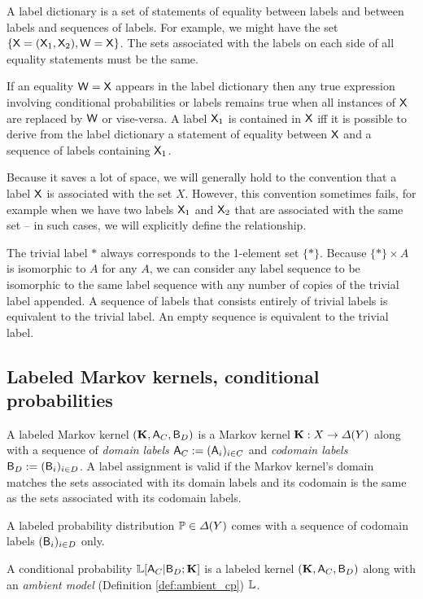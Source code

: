 A label dictionary is a set of statements of equality between labels and between labels and sequences of labels. For example, we might have the set $\{\mathsf{X}=(\mathsf{X}_1,\mathsf{X}_2),\mathsf{W}=\mathsf{X}\}$. The sets associated with the labels on each side of all equality statements must be the same.

If an equality $\mathsf{W}=\mathsf{X}$ appears in the label dictionary then any true expression involving conditional probabilities or labels remains true when all instances of $\mathsf{X}$ are replaced by $\mathsf{W}$ or vise-versa. A label $\mathsf{X}_1$ is contained in $\mathsf{X}$ iff it is possible to derive from the label dictionary a statement of equality between $\mathsf{X}$ and a sequence of labels containing $\mathsf{X}_1$.

Because it saves a lot of space, we will generally hold to the convention that a label $\mathsf{X}$ is associated with the set $X$. However, this convention sometimes fails, for example when we have two labels $\mathsf{X}_1$ and $\mathsf{X}_2$ that are associated with the same set -- in such cases, we will explicitly define the relationship.

The trivial label $*$ always corresponds to the 1-element set $\{*\}$. Because $\{*\}\times A$ is isomorphic to $A$ for any $A$, we can consider any label sequence to be isomorphic to the same label sequence with any number of copies of the trivial label appended. A sequence of labels that consists entirely of trivial labels is equivalent to the trivial label. An empty sequence is equivalent to the trivial label.


\subsection{Labeled Markov kernels, conditional probabilities}\label{sec:cp}

A labeled Markov kernel $(\mathbf{K},\mathsf{A}_C,\mathsf{B}_D)$ is a Markov kernel $\mathbf{K}:X\to \Delta(Y)$ along with a sequence of \emph{domain labels} $\mathsf{A}_C:=(\mathsf{A}_i)_{i\in C}$ and \emph{codomain labels} $\mathsf{B}_D:=(\mathsf{B}_i)_{i\in D}$. A label assignment is valid if the Markov kernel's domain matches the sets associated with its domain labels and its codomain is the same as the sets associated with its codomain labels.

A labeled probability distribution $\mathbb{P}\in\Delta(Y)$ comes with a sequence of codomain labels $(\mathsf{B}_i)_{i\in D}$ only.

A conditional probability $\mathbb{L}[\mathsf{A}_C|\mathsf{B}_D;\mathbf{K}]$ is a labeled kernel $(\mathbf{K},\mathsf{A}_C,\mathsf{B}_D)$ along with an \emph{ambient model} (Definition \ref{def:ambient_cp}) $\mathbb{L}$.

